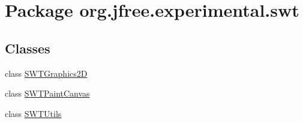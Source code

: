 \hypertarget{namespaceorg_1_1jfree_1_1experimental_1_1swt}{}\section{Package org.\+jfree.\+experimental.\+swt}
\label{namespaceorg_1_1jfree_1_1experimental_1_1swt}
\subsection*{Classes}
\begin{DoxyCompactItemize}
\item 
class \mbox{\hyperlink{classorg_1_1jfree_1_1experimental_1_1swt_1_1_s_w_t_graphics2_d}{S\+W\+T\+Graphics2D}}
\item 
class \mbox{\hyperlink{classorg_1_1jfree_1_1experimental_1_1swt_1_1_s_w_t_paint_canvas}{S\+W\+T\+Paint\+Canvas}}
\item 
class \mbox{\hyperlink{classorg_1_1jfree_1_1experimental_1_1swt_1_1_s_w_t_utils}{S\+W\+T\+Utils}}
\end{DoxyCompactItemize}
